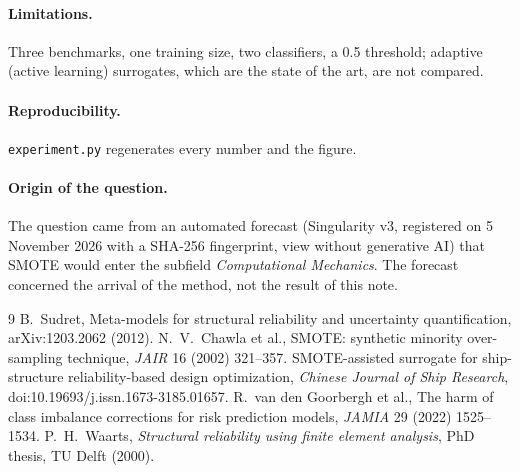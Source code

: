 \documentclass[11pt]{article}
\begin{document}
\paragraph{Limitations.} Three benchmarks, one training size, two classifiers, a 0.5 threshold; adaptive (active
learning) surrogates, which are the state of the art, are not compared.

\paragraph{Reproducibility.} \texttt{experiment.py} regenerates every number and the figure.

\paragraph{Origin of the question.} The question came from an automated forecast (Singularity v3, registered on 5
November 2026 with a SHA-256 fingerprint, view without generative AI) that SMOTE would enter the subfield
\emph{Computational Mechanics}. The forecast concerned the arrival of the method, not the result of this note.

\begin{thebibliography}{9}
 B.~Sudret, Meta-models for structural reliability and uncertainty quantification, arXiv:1203.2062 (2012).
 N.~V.~Chawla et al., SMOTE: synthetic minority over-sampling technique, \emph{JAIR} 16 (2002) 321--357.
 SMOTE-assisted surrogate for ship-structure reliability-based design optimization, \emph{Chinese Journal of Ship Research}, doi:10.19693/j.issn.1673-3185.01657.
 R.~van den Goorbergh et al., The harm of class imbalance corrections for risk prediction models, \emph{JAMIA} 29 (2022) 1525--1534.
 P.~H.~Waarts, \emph{Structural reliability using finite element analysis}, PhD thesis, TU Delft (2000).
\end{thebibliography}
\end{document}
